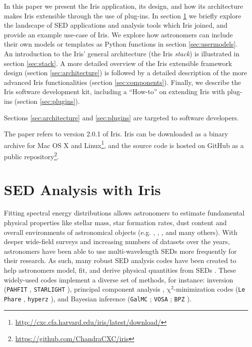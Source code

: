 \documentclass[final,5p]{elsarticle}
\begin{document}
In this paper we present the Iris application, its design, and how its architecture makes Iris extensible through the use of plug-ins. In section \ref{sec:overview} we briefly explore the landscape of SED applications and analysis tools which Iris joined, and provide an example use-case of Iris. We explore how astronomers can include their own models or templates as Python functions in section \ref{sec:usermodels}. An introduction to the Iris' general architecture (the Iris \emph{stack}) is illustrated in section \ref{sec:stack}. A more detailed overview of the Iris extensible framework design (section \ref{sec:architecture}) is followed by a detailed description of the more advanced Iris functionalities (section \ref{sec:components}). Finally, we describe the Iris software development kit, including a ``How-to'' on extending Iris with plug-ins (section \ref{sec:plugins}).

Sections \ref{sec:architecture} and \ref{sec:plugins} are targeted to software developers.

The paper refers to version 2.0.1 of Iris. Iris can be downloaded as a binary archive for Mac OS X and Linux\footnote{\url{http://cxc.cfa.harvard.edu/iris/latest/download/}}, and the source code is hosted on GitHub as a public repository\footnote{\url{https://github.com/ChandraCXC/iris}}.

\section{SED Analysis with Iris}
\label{sec:overview}

Fitting spectral energy distributions allows astronomers to estimate fundamental physical properties like stellar mass, star formation rates, dust content and overall environments of astronomical objects (e.g. \citep{1998AJ....115.1329S}, \citep{2001ApJS..137..139S}, \citep{2007ApJS..169..328R}, and many others). With deeper wide-field surveys and increasing numbers of datasets over the years, astronomers have been able to use multi-wavelength SEDs more frequently for their research. As such, many robust SED analysis codes have been created to help astronomers model, fit, and derive physical quantities from SEDs \citep{2011Ap&SS.331....1W,2013ARA&A..51..393C}. These widely-used codes implement a diverse set of methods, for instance: inversion (\texttt{PAHFIT} \citep{2007ApJ...656..770S}, \texttt{STAR\-LIGHT} \cite{2004MNRAS.355..273C}), principal component analysis \citep{2009MNRAS.394.1496B}, $\mathrm{\chi}^{2}$-minimization codes (\texttt{Le Phare} \citep{1999MNRAS.310..540A}, \texttt{hyperz} \citep{2000A&A...363..476B}), and Bayesian inference (\texttt{GalMC} \citep{2011ApJ...737...47A}; \texttt{VOSA} \citep{2008A&A...492..277B}; \texttt{BPZ} \citep{2000ApJ...536..571B}).
\end{document}
